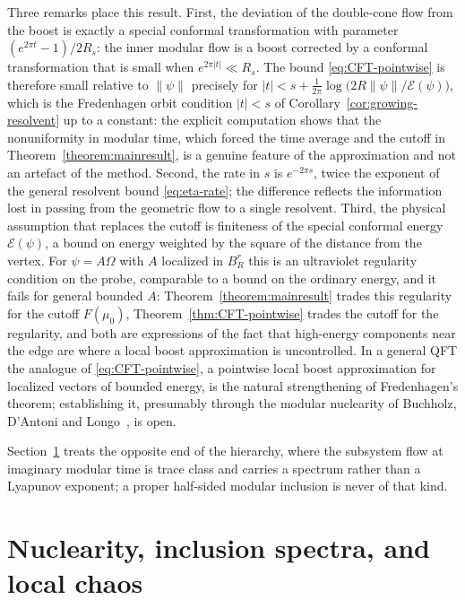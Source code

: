 \documentclass[a4paper,11pt]{article}
\theoremstyle{definition}
\begin{document}
Three remarks place this result. First, the deviation of the double-cone flow from the boost is exactly a special conformal transformation with parameter $(e^{2\pi t}-1)/2R_s$: the inner modular flow is a boost corrected by a conformal transformation that is small when $e^{2\pi|t|}\ll R_s$. The bound \eqref{eq:CFT-pointwise} is therefore small relative to $\|\psi\|$ precisely for $|t|<s+\frac1{2\pi}\log\bigl(2R\|\psi\|/\mathcal E(\psi)\bigr)$, which is the Fredenhagen orbit condition $|t|<s$ of Corollary~\ref{cor:growing-resolvent} up to a constant: the explicit computation shows that the nonuniformity in modular time, which forced the time average and the cutoff in Theorem~\ref{theorem:mainresult}, is a genuine feature of the approximation and not an artefact of the method. Second, the rate in $s$ is $e^{-2\pi s}$, twice the exponent of the general resolvent bound \eqref{eq:eta-rate}; the difference reflects the information lost in passing from the geometric flow to a single resolvent. Third, the physical assumption that replaces the cutoff is finiteness of the special conformal energy $\mathcal E(\psi)$, a bound on energy weighted by the square of the distance from the vertex. For $\psi=A\Omega$ with $A$ localized in $B_R^r$ this is an ultraviolet regularity condition on the probe, comparable to a bound on the ordinary energy, and it fails for general bounded $A$: Theorem~\ref{theorem:mainresult} trades this regularity for the cutoff $F(\mu_0)$, Theorem~\ref{thm:CFT-pointwise} trades the cutoff for the regularity, and both are expressions of the fact that high-energy components near the edge are where a local boost approximation is uncontrolled. In a general QFT the analogue of \eqref{eq:CFT-pointwise}, a pointwise local boost approximation for localized vectors of bounded energy, is the natural strengthening of Fredenhagen's theorem; establishing it, presumably through the modular nuclearity of Buchholz, D'Antoni and Longo~\cite{BDL1990}, is open.


Section~\ref{sec:nuclearity} treats the opposite end of the hierarchy, where the subsystem flow at imaginary modular time is trace class and carries a spectrum rather than a Lyapunov exponent; a proper half-sided modular inclusion is never of that kind.


\section{Nuclearity, inclusion spectra, and local chaos}\label{sec:nuclearity}
\end{document}
